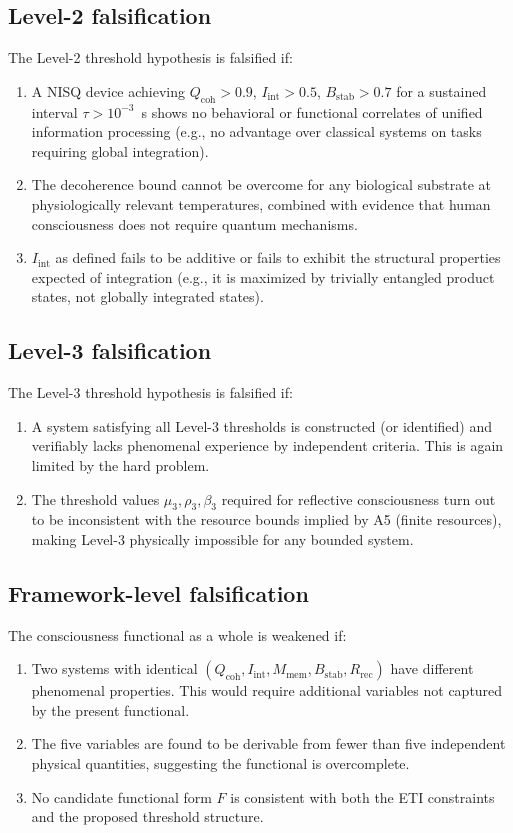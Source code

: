 \documentclass[12pt,letterpaper]{article}
\newcommand{\Qcoh}{Q_{\mathrm{coh}}}
\newcommand{\Iint}{I_{\mathrm{int}}}
\newcommand{\Mmem}{M_{\mathrm{mem}}}
\newcommand{\Bstab}{B_{\mathrm{stab}}}
\newcommand{\Rrec}{R_{\mathrm{rec}}}
\begin{document}
\subsection{Level-2 falsification}

The Level-2 threshold hypothesis is falsified if:
\begin{enumerate}[label=(F2.\arabic*)]
  \item A NISQ device achieving $\Qcoh > 0.9$, $\Iint > 0.5$, $\Bstab > 0.7$
    for a sustained interval $\tau > 10^{-3}$~s shows no behavioral or
    functional correlates of unified information processing (e.g., no
    advantage over classical systems on tasks requiring global integration).
  \item The decoherence bound cannot be overcome for any biological substrate
    at physiologically relevant temperatures, combined with evidence that
    human consciousness does not require quantum mechanisms.
  \item $\Iint$ as defined fails to be additive or fails to exhibit the
    structural properties expected of integration (e.g., it is maximized
    by trivially entangled product states, not globally integrated states).
\end{enumerate}

\subsection{Level-3 falsification}

The Level-3 threshold hypothesis is falsified if:
\begin{enumerate}[label=(F3.\arabic*)]
  \item A system satisfying all Level-3 thresholds is constructed (or
    identified) and verifiably lacks phenomenal experience by independent
    criteria. This is again limited by the hard problem.
  \item The threshold values $\mu_3, \rho_3, \beta_3$ required for reflective
    consciousness turn out to be inconsistent with the resource bounds
    implied by A5 (finite resources), making Level-3 physically impossible
    for any bounded system.
\end{enumerate}

\subsection{Framework-level falsification}

The consciousness functional as a whole is weakened if:
\begin{enumerate}[label=(FF.\arabic*)]
  \item Two systems with identical $(\Qcoh, \Iint, \Mmem, \Bstab, \Rrec)$
    have different phenomenal properties. This would require additional
    variables not captured by the present functional.
  \item The five variables are found to be derivable from fewer than five
    independent physical quantities, suggesting the functional is overcomplete.
  \item No candidate functional form $F$ is consistent with both the
    ETI constraints and the proposed threshold structure.
\end{enumerate}
\end{document}
